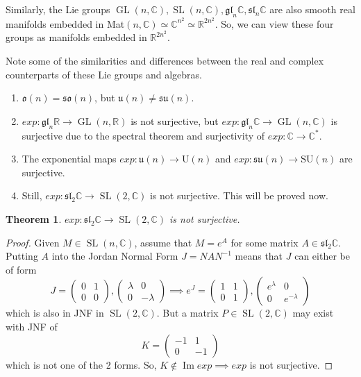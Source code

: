 \documentclass{article}
\DeclareMathOperator{\im}{Im}
\DeclareMathOperator{\GL}{GL}
\DeclareMathOperator{\SL}{SL}
\newtheorem{theorem}{Theorem}[section]
\theoremstyle{remark}
\theoremstyle{definition}
\begin{document}
Similarly, the Lie groups $\GL(n, \mathbb{C}), \SL(n, \mathbb{C}), \mathfrak{gl}_n \mathbb{C}, \mathfrak{sl}_n \mathbb{C}$ are also smooth real manifolds embedded in Mat$(n, \mathbb{C}) \simeq \mathbb{C}^{n^2} \simeq \mathbb{R}^{2 n^2}$. So, we can view these four groups as manifolds embedded in $\mathbb{R}^{2 n^2}$. 

Note some of the similarities and differences between the real and complex counterparts of these Lie groups and algebras. 
\begin{enumerate}
    \item $\mathfrak{o}(n) = \mathfrak{so}(n)$, but $\mathfrak{u}(n) \neq \mathfrak{su}(n)$. 
    \item $exp: \mathfrak{gl}_n \mathbb{R} \longrightarrow \GL(n, \mathbb{R})$ is not surjective, but $exp: \mathfrak{gl}_n \mathbb{C} \longrightarrow \GL(n, \mathbb{C})$ is surjective due to the spectral theorem and surjectivity of $exp: \mathbb{C} \longrightarrow \mathbb{C}^*$.
    \item The exponential maps $exp: \mathfrak{u}(n) \longrightarrow \text{U}(n)$ and $exp: \mathfrak{su}(n) \longrightarrow \text{SU}(n)$ are surjective. 
    \item Still, $exp: \mathfrak{sl}_2 \mathbb{C} \longrightarrow \SL(2, \mathbb{C})$ is not surjective. This will be proved now. 
\end{enumerate}

\begin{theorem}
$exp: \mathfrak{sl}_2 \mathbb{C} \longrightarrow \SL(2, \mathbb{C})$ is not surjective. 
\end{theorem}
\begin{proof}
Given $M \in \SL(n, \mathbb{C})$, assume that $M = e^A$ for some matrix $A \in \mathfrak{sl}_2 \mathbb{C}$. Putting $A$ into the Jordan Normal Form $J = N A N^{-1}$ means that $J$ can either be of form
\[J = \begin{pmatrix}
0&1\\0&0
\end{pmatrix}, \begin{pmatrix}
\lambda&0\\0&-\lambda
\end{pmatrix} \implies e^J = \begin{pmatrix}
1&1\\0&1
\end{pmatrix}, \begin{pmatrix}
e^\lambda&0\\0&e^{-\lambda}
\end{pmatrix}\]
which is also in JNF in $\SL(2, \mathbb{C})$. But a matrix $P \in \SL(2, \mathbb{C})$ may exist with JNF of 
\[K = \begin{pmatrix}
-1&1\\0&-1
\end{pmatrix}\]
which is not one of the 2 forms. So, $K \not\in \im{exp} \implies exp$ is not surjective. 
\end{proof}
\end{document}
